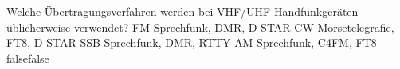     {Welche Übertragungsverfahren werden bei VHF/UHF-Handfunkgeräten üblicherweise verwendet?}
    {FM-Sprechfunk, DMR, D-STAR}
    {CW-Morsetelegrafie, FT8, D-STAR}
    {SSB-Sprechfunk, DMR, RTTY}
    {AM-Sprechfunk, C4FM, FT8}
    {false}{false}